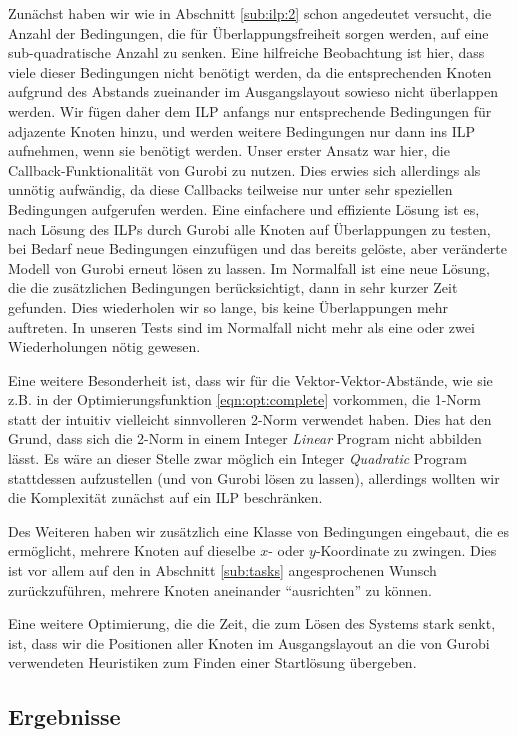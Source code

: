 Zunächst haben wir wie in Abschnitt \ref{sub:ilp:2} schon angedeutet versucht, die Anzahl der Bedingungen, die für Überlappungsfreiheit sorgen werden, auf eine sub-quadratische Anzahl zu senken. Eine hilfreiche Beobachtung ist hier, dass viele dieser Bedingungen nicht benötigt werden, da die entsprechenden Knoten aufgrund des Abstands zueinander im Ausgangslayout sowieso nicht überlappen werden. Wir fügen daher dem ILP anfangs nur entsprechende Bedingungen für adjazente Knoten hinzu, und werden weitere Bedingungen nur dann ins ILP aufnehmen, wenn sie benötigt werden. Unser erster Ansatz war hier, die Callback-Funktionalität von Gurobi zu nutzen. Dies erwies sich allerdings als unnötig aufwändig, da diese Callbacks teilweise nur unter sehr speziellen Bedingungen aufgerufen werden. Eine einfachere und effiziente Lösung ist es, nach Lösung des ILPs durch Gurobi alle Knoten auf Überlappungen zu testen, bei Bedarf neue Bedingungen einzufügen und das bereits gelöste, aber veränderte Modell von Gurobi erneut lösen zu lassen. Im Normalfall ist eine neue Lösung, die die zusätzlichen Bedingungen berücksichtigt, dann in sehr kurzer Zeit gefunden. Dies wiederholen wir so lange, bis keine Überlappungen mehr auftreten. In unseren Tests sind im Normalfall nicht mehr als eine oder zwei Wiederholungen nötig gewesen.

Eine weitere Besonderheit ist, dass wir für die Vektor-Vektor-Abstände, wie sie z.B. in der Optimierungsfunktion \ref{eqn:opt:complete} vorkommen, die 1-Norm statt der intuitiv vielleicht sinnvolleren 2-Norm verwendet haben. Dies hat den Grund, dass sich die 2-Norm in einem Integer \textit{Linear} Program nicht abbilden lässt. Es wäre an dieser Stelle zwar möglich ein Integer \textit{Quadratic} Program stattdessen aufzustellen (und von Gurobi lösen zu lassen), allerdings wollten wir die Komplexität zunächst auf ein ILP beschränken.

Des Weiteren haben wir zusätzlich eine Klasse von Bedingungen eingebaut, die es ermöglicht, mehrere Knoten auf dieselbe $x$- oder $y$-Koordinate zu zwingen. Dies ist vor allem auf den in Abschnitt \ref{sub:tasks} angesprochenen Wunsch zurückzuführen, mehrere Knoten aneinander "`ausrichten"' zu können.

Eine weitere Optimierung, die die Zeit, die zum Lösen des Systems stark senkt, ist, dass wir die Positionen aller Knoten im Ausgangslayout an die von Gurobi verwendeten Heuristiken zum Finden einer Startlösung übergeben.

\subsection{Ergebnisse}

